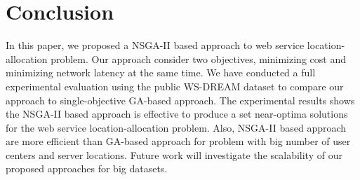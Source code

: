 \documentclass{llncs}
\begin{document}
%



\section{Conclusion}
\label{sec:conclusion}
In this paper, we proposed a NSGA-II based approach to web service location-allocation problem. 
Our approach consider two objectives, minimizing cost  and minimizing network latency at the same time.
We have conducted a full experimental evaluation using the public WS-DREAM dataset to compare our approach to single-objective GA-based approach.
The experimental results shows the NSGA-II based approach is effective to produce a set near-optima solutions for the web service location-allocation problem.
Also, NSGA-II based approach are more efficient than GA-based approach for problem with big number of user centers and server locations. Future work will investigate the scalability of 
our proposed approaches for big datasets.




\end{document}
